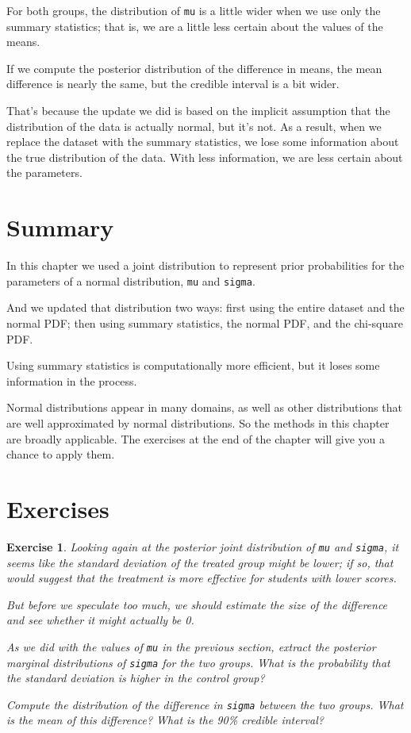 \documentclass[12pt]{book}
\theoremstyle{exercise}
\newtheorem{exercise}{Exercise}[chapter]
\newcommand{\py}[1]{{\tt #1}}%
\begin{document}
For both groups, the distribution of \py{mu} is a little wider when we use only the summary statistics; that is, we are a little less certain about the values of the means.

If we compute the posterior distribution of the difference in means,
the mean difference is nearly the same, but the credible interval is a bit wider.

That's because the update we did is based on the implicit assumption
that the distribution of the data is actually normal, but it's not.
As a result, when we replace the dataset with the summary statistics, we lose some information about the true distribution of the data. With less
information, we are less certain about the parameters.

\section{Summary}

In this chapter we used a joint distribution to represent prior
probabilities for the parameters of a normal distribution,
\py{mu} and \py{sigma}.

And we updated that distribution two ways: first using the entire
dataset and the normal PDF; then using summary statistics, the normal
PDF, and the chi-square PDF.

Using summary statistics is computationally more efficient, but it loses
some information in the process.

Normal distributions appear in many domains, as well as other
distributions that are well approximated by normal distributions. So the
methods in this chapter are broadly applicable. The exercises at the end
of the chapter will give you a chance to apply them.

\section{Exercises}

\begin{exercise}
Looking again at the posterior joint distribution of
\py{mu} and \py{sigma}, it
seems like the standard deviation of the treated group might be lower;
if so, that would suggest that the treatment is more effective for
students with lower scores.

But before we speculate too much, we should estimate the size of the
difference and see whether it might actually be 0.

As we did with the values of \py{mu} in the
previous section, extract the posterior marginal distributions of
\py{sigma} for the two groups. What is the
probability that the standard deviation is higher in the control group?

Compute the distribution of the difference in
\py{sigma} between the two groups. What is the mean
of this difference? What is the 90\% credible interval?

\end{exercise}
\end{document}
